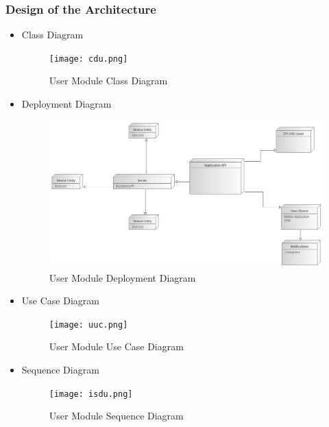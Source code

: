 \documentclass{article}
\begin{document}
	\subsubsection{Design of the Architecture}
		\begin{itemize}
 				\item Class Diagram
 				\begin{center}
					\begin{figure}[!h]
					\texttt{[image: cdu.png]}
					\caption{User Module Class Diagram}
					\end{figure}
				\end{center}
	 			\clearpage
	 			
	 			\item Deployment Diagram				
	 			\begin{center}
	 				\begin{figure}[!h]
	 					\includegraphics[scale=0.3]{dd.png}
	 					\caption{User Module Deployment Diagram}
	 				\end{figure}
	 			\end{center}
	 			
	 			\item Use Case Diagram
	 			\begin{center}
	 				\begin{figure}[!h]
	 					\texttt{[image: uuc.png]}
	 					\caption{User Module Use Case Diagram}
	 				\end{figure}
	 			\end{center}
	 			\pagebreak
	 			
				\item Sequence Diagram				
 				\begin{center}
 					\begin{figure}[!h]
 						\texttt{[image: isdu.png]}
 						\caption{User Module Sequence Diagram}
 					\end{figure}
 				\end{center}
 				

\end{itemize}
\end{document}
